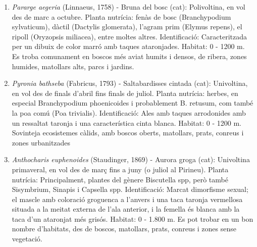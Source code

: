 \documentclass{article}
\begin{document}
\begin{enumerate}
    \item {\it Pararge aegeria} (Linnaeus, 1758) - Bruna del bosc (cat): Polivoltina, en vol des de marc a octubre. Planta nutrícia: fenàs de bosc (Branchypodium sylvaticum), dàctil (Dactylis glomerata), l'agram prim (Elymus repens), el ripoll (Oryzopsis miliacea), entre moltes altres. Identificació: Caracteritzada per un dibuix de color marró amb taques ataronjades. Habitat: 0 - 1200 m. Es troba comunament en boscos més aviat humits i densos, de ribera, zones humides, matollars alts, parcs i jardins.

    \item {\it Pyronia bathseba} (Fabricus, 1793) - Saltabardisses cintada (cat): Univoltina, en vol des de finals d'abril fins finals de juliol. Planta nutrícia: herbes, en especial Branchypodium phoenicoides i probablement B. retusum, com també la poa comú (Poa trivialis). Identificació: Ales amb taques arrodonides amb un ressaltat taronja i una característica cinta blanca. Habitat: 0 - 1200 m. Sovinteja ecosistemes càlids, amb boscos oberts, matollars, prats, conreus i zones urbanitzades


    \item {\it Anthocharis euphenoides} (Staudinger, 1869) - Aurora groga (cat): Univoltina primaveral, en vol des de març fins a juny (o juliol al Pirineu). Planta nutrícia: Principalment, plantes del gènere Biscutella spp, però també Sisymbrium, Sinapis i Capsella spp.  Identificació: Marcat dimorfisme sexual; el mascle amb coloració groguenca a l'anvers i una taca taronja vermellosa situada a la meitat externa de l'ala anterior, i la femella és blanca amb la taca d'un ataronjat més grisós. Habitat: 0 - 1.800 m. Es pot trobar en un bon nombre d'habitats, des de boscos, matollars, prats, conreus i zones sense vegetació.
\end{enumerate}
\end{document}
